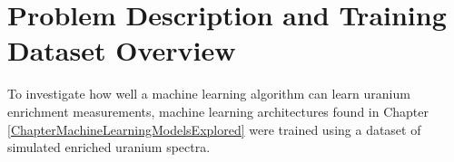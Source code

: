 



\section{Problem Description and Training Dataset Overview}

To investigate how well a machine learning algorithm can learn uranium enrichment measurements, machine learning architectures found in Chapter \ref{ChapterMachineLearningModelsExplored} were trained using a dataset of simulated enriched uranium spectra.


